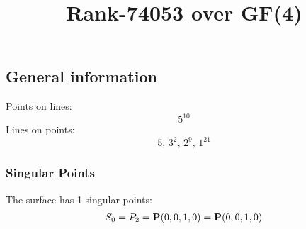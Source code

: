 \documentclass{article}
\newcommand\setTBstruts{\def\T{\rule{0pt}{2.6ex}}%
\def\B{\rule[-1.2ex]{0pt}{0pt}}}
\newcommand{\bP}{{\bf P}}
\begin{document}
 
\setTBstruts



{\allowdisplaybreaks%






\title{Rank-74053 over GF(4)}
\author{}%
\maketitle%
%
{}



\subsection*{General information}
Points on lines:
$$
5^{10}$$
Lines on points:
$$
5,\,3^2,\,2^9,\,1^{21}$$
\subsubsection*{Singular Points}
The surface has 1 singular points:\\
\begin{align*}
S_{0} &= P_{2}=\bP(0, 0, 1, 0) = \bP(0, 0, 1, 0)\\
\end{align*}
}
\end{document}
